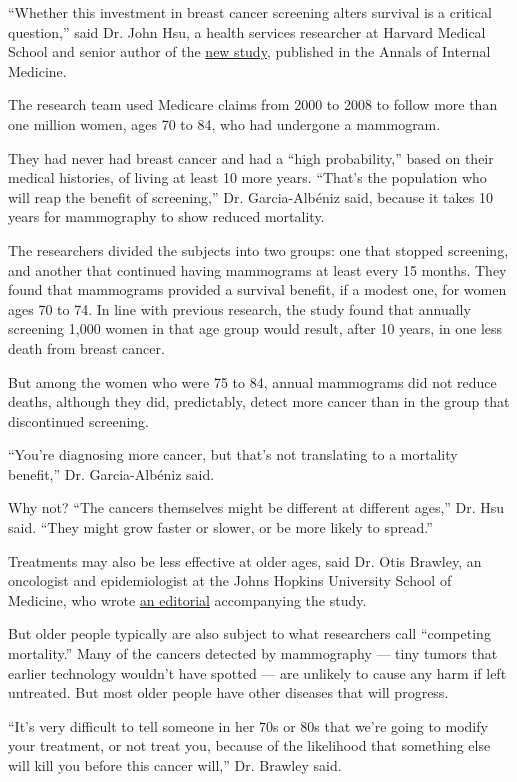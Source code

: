 ``Whether this investment in breast cancer screening alters survival is
a critical question,'' said Dr. John Hsu, a health services researcher
at Harvard Medical School and senior author of the
\href{http://annals.org/aim/article/doi/10.7326/M18-1199}{new study},
published in the Annals of Internal Medicine.

The research team used Medicare claims from 2000 to 2008 to follow more
than one million women, ages 70 to 84, who had undergone a mammogram.

They had never had breast cancer and had a ``high probability,'' based
on their medical histories, of living at least 10 more years. ``That's
the population who will reap the benefit of screening,'' Dr.
Garcia-Albéniz said, because it takes 10 years for mammography to show
reduced mortality.

The researchers divided the subjects into two groups: one that stopped
screening, and another that continued having mammograms at least every
15 months. They found that mammograms provided a survival benefit, if a
modest one, for women ages 70 to 74. In line with previous research, the
study found that annually screening 1,000 women in that age group would
result, after 10 years, in one less death from breast cancer.

But among the women who were 75 to 84, annual mammograms did not reduce
deaths, although they did, predictably, detect more cancer than in the
group that discontinued screening.

``You're diagnosing more cancer, but that's not translating to a
mortality benefit,'' Dr. Garcia-Albéniz said.

Why not? ``The cancers themselves might be different at different
ages,'' Dr. Hsu said. ``They might grow faster or slower, or be more
likely to spread.''

Treatments may also be less effective at older ages, said Dr. Otis
Brawley, an oncologist and epidemiologist at the Johns Hopkins
University School of Medicine, who wrote
\href{http://annals.org/aim/article/doi/10.7326/M20-0429}{an editorial}
accompanying the study.

But older people typically are also subject to what researchers call
``competing mortality.'' Many of the cancers detected by mammography ---
tiny tumors that earlier technology wouldn't have spotted --- are
unlikely to cause any harm if left untreated. But most older people have
other diseases that will progress.

``It's very difficult to tell someone in her 70s or 80s that we're going
to modify your treatment, or not treat you, because of the likelihood
that something else will kill you before this cancer will,'' Dr. Brawley
said.

